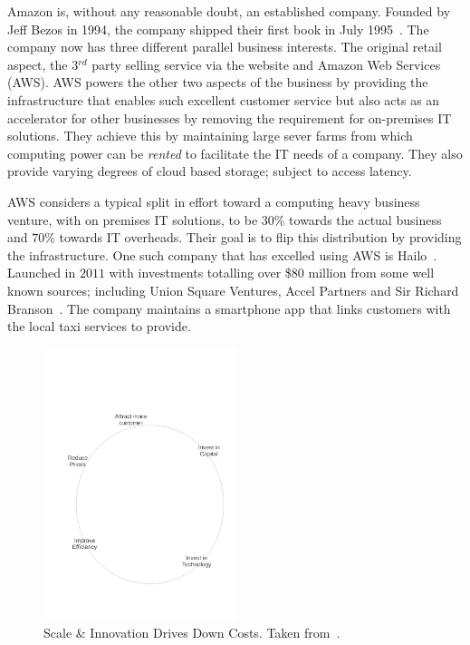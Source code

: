 {}

Amazon is, without any reasonable doubt, an established company.
Founded by Jeff Bezos in 1994, the company shipped their first book in July 1995~\cite{seattle}.
The company now has three different parallel business interests.
The original retail aspect, the 3$^{rd}$ party selling service via the website and Amazon Web Services (AWS).
AWS powers the other two aspects of the business by providing the infrastructure that enables such excellent customer service but also acts as an accelerator for other businesses by removing the requirement for on-premises IT solutions.
They achieve this by maintaining large sever farms from which computing power can be \emph{rented} to facilitate the IT needs of a company.
They also provide varying degrees of cloud based storage; subject to access latency.

AWS considers a typical split in effort toward a computing heavy business venture, with on premises IT solutions, to be $30$\% towards the actual business and $70$\% towards IT overheads. 
Their goal is to flip this distribution by providing the infrastructure. 
One such company that has excelled using AWS is Hailo~\cite{gavin2014ams}.
Launched in $2011$ with investments totalling over \$$80$ million from some well known sources; including Union Square Ventures, Accel Partners and Sir Richard Branson~\cite{hailo}.
The company maintains a smartphone app that links customers with the local taxi services to provide.




\begin{figure}
	\centering
	\includegraphics[width=0.5\textwidth]{./Figures/ScaleInnovation.pdf}
	\caption{Scale \& Innovation Drives Down Costs. Taken from~\cite{gavin2014ams}.}
	\label{fig:ScaleInnovation}
\end{figure}

